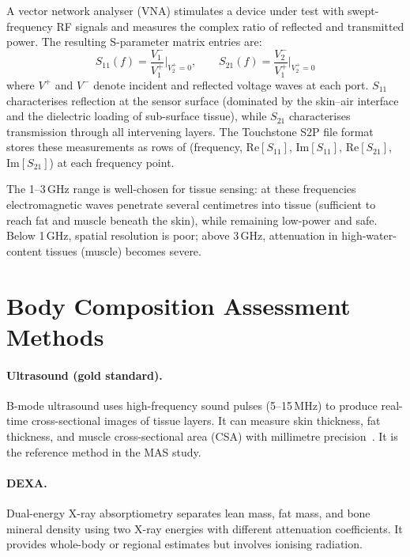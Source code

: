 \documentclass[12pt, a4paper, oneside]{report}
\begin{document}
A vector network analyser (VNA) stimulates a device under test with swept-frequency RF signals and measures the complex ratio of reflected and transmitted power. The resulting S-parameter matrix entries are:
\begin{equation}
  S_{11}(f) = \frac{V_1^-}{V_1^+}\bigg|_{V_2^+=0}, \qquad
  S_{21}(f) = \frac{V_2^-}{V_1^+}\bigg|_{V_2^+=0}
\end{equation}
where $V^+$ and $V^-$ denote incident and reflected voltage waves at each port. $S_{11}$ characterises reflection at the sensor surface (dominated by the skin--air interface and the dielectric loading of sub-surface tissue), while $S_{21}$ characterises transmission through all intervening layers. The Touchstone S2P file format stores these measurements as rows of (frequency, $\mathrm{Re}[S_{11}]$, $\mathrm{Im}[S_{11}]$, $\mathrm{Re}[S_{21}]$, $\mathrm{Im}[S_{21}]$) at each frequency point.

The 1--3\,GHz range is well-chosen for tissue sensing: at these frequencies electromagnetic waves penetrate several centimetres into tissue (sufficient to reach fat and muscle beneath the skin), while remaining low-power and safe. Below 1\,GHz, spatial resolution is poor; above 3\,GHz, attenuation in high-water-content tissues (muscle) becomes severe.

\section{Body Composition Assessment Methods}

\paragraph{Ultrasound (gold standard).} B-mode ultrasound uses high-frequency sound pulses (5--15\,MHz) to produce real-time cross-sectional images of tissue layers. It can measure skin thickness, fat thickness, and muscle cross-sectional area (CSA) with millimetre precision~\cite{mueller2014}. It is the reference method in the MAS study.

\paragraph{DEXA.} Dual-energy X-ray absorptiometry separates lean mass, fat mass, and bone mineral density using two X-ray energies with different attenuation coefficients. It provides whole-body or regional estimates but involves ionising radiation.
\end{document}
